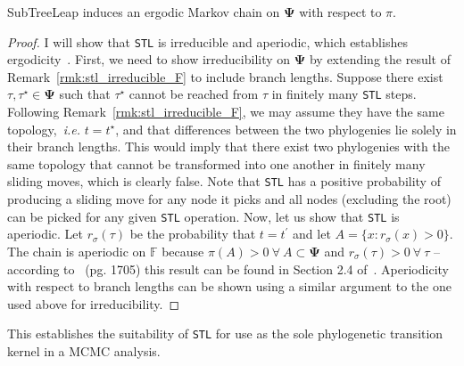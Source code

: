 \begin{theorem}
\label{thm:stl_ergodic}
 SubTreeLeap induces an ergodic Markov chain on $\boldsymbol\Psi$ with respect to $\pi$. %
\end{theorem}
\begin{proof}
 I will show that \verb|STL| is irreducible and aperiodic, which establishes ergodicity~\citep{Meyn1993,Roberts2004,Dinh2017}.
 First, we need to show irreducibility on $\boldsymbol\Psi$ by extending the result of Remark~\ref{rmk:stl_irreducible_F} to include branch lengths.
 Suppose there exist $\tau, \tau^\star \in \boldsymbol\Psi$ such that $\tau^\star$ cannot be reached from $\tau$ in finitely many \verb|STL| steps.
 Following Remark~\ref{rmk:stl_irreducible_F}, we may assume they have the same topology,~\textit{i.e.} $t = t^\star$, and that differences between the two phylogenies lie solely in their branch lengths.
 This would imply that there exist two phylogenies with the same topology that cannot be transformed into one another in finitely many sliding moves, which is clearly false.
 Note that \verb|STL| has a positive probability of producing a sliding move for any node it picks and all nodes (excluding the root) can be picked for any given \verb|STL| operation.
 Now, let us show that \verb|STL| is aperiodic.
 Let $r_\sigma(\tau)$ be the probability that $t = t^\prime$ and let $A = \{x : r_\sigma(x) > 0\}$.
 The chain is aperiodic on $\mathbb{F}$ because $ \pi(A) > 0 \: \forall \: A \subset \boldsymbol \Psi$ and $r_\sigma(\tau) > 0 \: \forall \: \tau $  -- according to~\cite{Tierney1994} (pg. 1705) this result can be found in Section 2.4 of~\cite{Nummelin1984}.
 Aperiodicity with respect to branch lengths can be shown using a similar argument to the one used above for irreducibility.
\end{proof}
This establishes the suitability of \verb|STL| for use as the sole phylogenetic transition kernel in a MCMC analysis.

